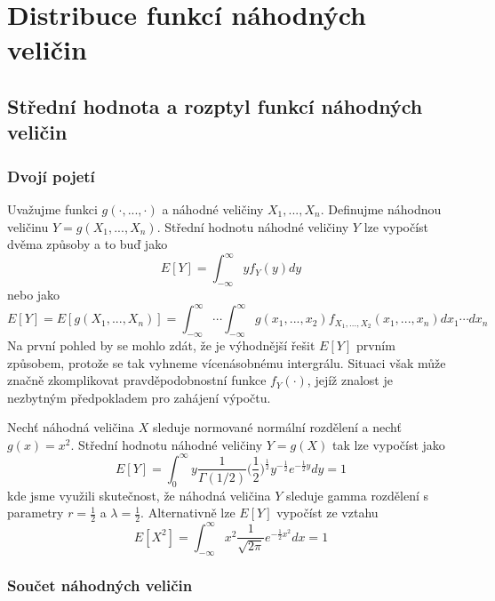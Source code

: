 \chapter{Distribuce funkcí náhodných veličin}

\section{Střední hodnota a rozptyl funkcí náhodných veličin}

\subsection{Dvojí pojetí}

Uvažujme funkci $g(\cdot, ..., \cdot)$ a náhodné veličiny $X_1, ..., X_n$. Definujme náhodnou veličinu $Y = g(X_1, ..., X_n)$. Střední hodnotu náhodné veličiny $Y$ lze vypočíst dvěma způsoby a to buď jako
\begin{equation*}
E[Y] = \int_{-\infty}^{\infty} y f_Y(y)dy
\end{equation*}
nebo jako
\begin{equation*}
E[Y] = E[g(X_1, ..., X_n)] = \int_{-\infty}^{\infty} \cdots \int_{-\infty}^{\infty} g(x_1, ..., x_2)f_{X_1, ..., X_2}(x_1, ..., x_n)dx_1 \cdots dx_n
\end{equation*}
Na první pohled by se mohlo zdát, že je výhodnější řešit $E[Y]$ prvním způsobem, protože se tak vyhneme vícenásobnému intergrálu. Situaci však může značně zkomplikovat pravděpodobnostní funkce $f_Y(\cdot)$, jejíž znalost je nezbytným předpokladem pro zahájení výpočtu.

\begin{example}
Nechť náhodná veličina $X$ sleduje normované normální rozdělení a nechť $g(x) = x^2$. Střední hodnotu náhodné veličiny $Y = g(X)$ tak lze vypočíst jako
\begin{equation*}
E[Y] = \int_0^{\infty} y \frac{1}{\Gamma(1/2)}\Big(\frac{1}{2} \Big)^{\frac{1}{2}}y^{-\frac{1}{2}}e^{-\frac{1}{2}y}dy = 1
\end{equation*}
kde jsme využili skutečnost, že náhodná veličina $Y$ sleduje gamma rozdělení s parametry $r = \frac{1}{2}$ a $\lambda = \frac{1}{2}$. Alternativně lze $E[Y]$ vypočíst ze vztahu
\begin{equation*}
E[X^2] = \int_{-\infty}^{\infty}x^2 \frac{1}{\sqrt{2 \pi}}e^{-\frac{1}{2}x^2}dx = 1
\end{equation*}
\end{example}

\subsection{Součet náhodných veličin}

